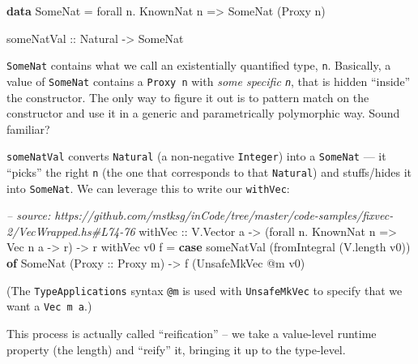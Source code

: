 \documentclass[]{article}
\newenvironment{Shaded}{}{}
\newcommand{\KeywordTok}[1]{\textcolor[rgb]{0.00,0.44,0.13}{\textbf{#1}}}
\newcommand{\DataTypeTok}[1]{\textcolor[rgb]{0.56,0.13,0.00}{#1}}
\newcommand{\CommentTok}[1]{\textcolor[rgb]{0.38,0.63,0.69}{\textit{#1}}}
\newcommand{\OtherTok}[1]{\textcolor[rgb]{0.00,0.44,0.13}{#1}}
\newcommand{\FunctionTok}[1]{\textcolor[rgb]{0.02,0.16,0.49}{#1}}
\newcommand{\NormalTok}[1]{#1}
\begin{document}
\begin{Shaded}
\begin{Highlighting}[]
\KeywordTok{data} \DataTypeTok{SomeNat} \FunctionTok{=}\NormalTok{ forall n}\FunctionTok{.} \DataTypeTok{KnownNat}\NormalTok{ n }\OtherTok{=>} \DataTypeTok{SomeNat}\NormalTok{ (}\DataTypeTok{Proxy}\NormalTok{ n)}

\OtherTok{someNatVal ::} \DataTypeTok{Natural} \OtherTok{->} \DataTypeTok{SomeNat}
\end{Highlighting}
\end{Shaded}

\texttt{SomeNat} contains what we call an existentially quantified type,
\texttt{n}. Basically, a value of \texttt{SomeNat} contains a \texttt{Proxy\ n}
with \emph{some specific \texttt{n}}, that is hidden ``inside'' the constructor.
The only way to figure it out is to pattern match on the constructor and use it
in a generic and parametrically polymorphic way. Sound familiar?

\texttt{someNatVal} converts \texttt{Natural} (a non-negative \texttt{Integer})
into a \texttt{SomeNat} --- it ``picks'' the right \texttt{n} (the one that
corresponds to that \texttt{Natural}) and stuffs/hides it into \texttt{SomeNat}.
We can leverage this to write our \texttt{withVec}:

\begin{Shaded}
\begin{Highlighting}[]
\CommentTok{-- source: https://github.com/mstksg/inCode/tree/master/code-samples/fixvec-2/VecWrapped.hs#L74-76}
\OtherTok{withVec ::} \DataTypeTok{V.Vector}\NormalTok{ a }\OtherTok{->}\NormalTok{ (forall n}\FunctionTok{.} \DataTypeTok{KnownNat}\NormalTok{ n }\OtherTok{=>} \DataTypeTok{Vec}\NormalTok{ n a }\OtherTok{->}\NormalTok{ r) }\OtherTok{->}\NormalTok{ r}
\NormalTok{withVec v0 f }\FunctionTok{=} \KeywordTok{case}\NormalTok{ someNatVal (fromIntegral (V.length v0)) }\KeywordTok{of}
    \DataTypeTok{SomeNat}\NormalTok{ (}\DataTypeTok{Proxy}\OtherTok{ ::} \DataTypeTok{Proxy}\NormalTok{ m) }\OtherTok{->}\NormalTok{ f (}\DataTypeTok{UnsafeMkVec} \FunctionTok{@}\NormalTok{m v0)}
\end{Highlighting}
\end{Shaded}

(The \texttt{TypeApplications} syntax \texttt{@m} is used with
\texttt{UnsafeMkVec} to specify that we want a \texttt{Vec\ m\ a}.)

This process is actually called ``reification'' -- we take a value-level runtime
property (the length) and ``reify'' it, bringing it up to the type-level.
\end{document}
